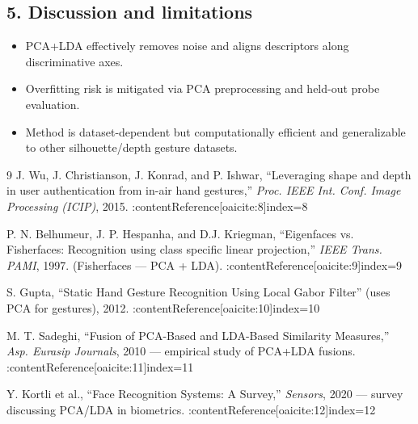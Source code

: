 \subsection*{5. Discussion and limitations}
\begin{itemize}
  \item PCA+LDA effectively removes noise and aligns descriptors along discriminative axes.  
  \item Overfitting risk is mitigated via PCA preprocessing and held-out probe evaluation.  
  \item Method is dataset-dependent but computationally efficient and generalizable to other silhouette/depth gesture datasets.
\end{itemize}




\begin{thebibliography}{9}
J. Wu, J. Christianson, J. Konrad, and P. Ishwar, ``Leveraging shape and depth in user authentication from in-air hand gestures,'' \emph{Proc. IEEE Int. Conf. Image Processing (ICIP)}, 2015. :contentReference[oaicite:8]{index=8}

P. N. Belhumeur, J. P. Hespanha, and D.J. Kriegman, ``Eigenfaces vs. Fisherfaces: Recognition using class specific linear projection,'' \emph{IEEE Trans. PAMI}, 1997. (Fisherfaces — PCA + LDA). :contentReference[oaicite:9]{index=9}

S. Gupta, ``Static Hand Gesture Recognition Using Local Gabor Filter'' (uses PCA for gestures), 2012. :contentReference[oaicite:10]{index=10}

M. T. Sadeghi, ``Fusion of PCA-Based and LDA-Based Similarity Measures,'' \emph{Asp. Eurasip Journals}, 2010 — empirical study of PCA+LDA fusions. :contentReference[oaicite:11]{index=11}

Y. Kortli et al., ``Face Recognition Systems: A Survey,'' \emph{Sensors}, 2020 — survey discussing PCA/LDA in biometrics. :contentReference[oaicite:12]{index=12}
\end{thebibliography}


